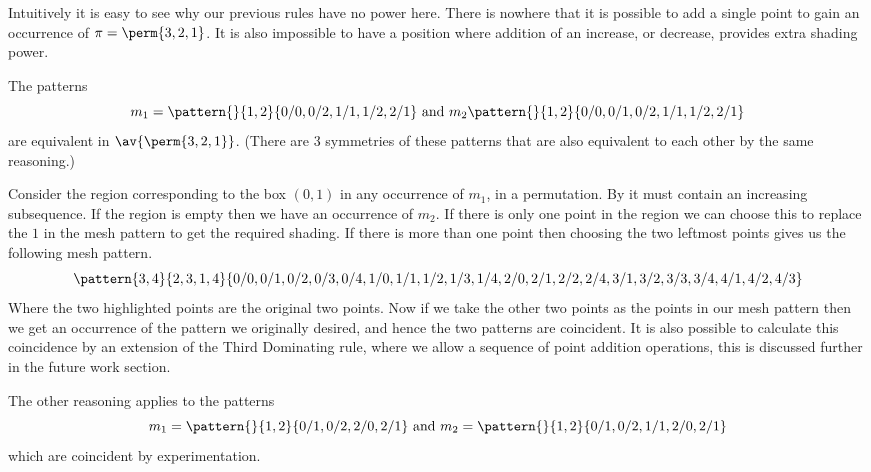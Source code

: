 Intuitively it is easy to see why our previous rules have no
power here. There is nowhere that it is possible to add a single point to
gain an occurrence of \(\pi = \perm{3,2,1}\). It is also impossible to have
a position where addition of an increase, or decrease, provides extra
shading power.

The patterns
\begin{equation*}
    m_1 = \pattern{}{1,2}{0/0, 0/2, 1/1, 1/2, 2/1} \text { and } m_2 \pattern{}{1,2}{0/0, 0/1, 0/2, 1/1, 1/2, 2/1}
\end{equation*}
are equivalent in \(\av{\perm{3,2,1}}\). (There are 3 symmetries of these
patterns that are also equivalent to each other by the same reasoning.)

Consider the region corresponding to the box \((0,1)\) in any occurrence of \(m_1\),
in a permutation. By  it must contain an increasing subsequence.
If the region is empty then we have an occurrence of \(m_2\).
If there is only one point in the region we can choose this to replace the \(1\) in
the mesh pattern to get the required shading. If there is more than one point then
choosing the two leftmost points gives us the following mesh pattern.
\begin{equation*}
    \pattern{3,4}{2,3,1,4}{0/0, 0/1, 0/2, 0/3, 0/4,
                            1/0, 1/1, 1/2, 1/3, 1/4,
                            2/0, 2/1,2/2, 2/4,
                            3/1, 3/2, 3/3, 3/4,
                            4/1, 4/2, 4/3}
\end{equation*}
Where the two highlighted points are the original two points.
Now if we take the other two points as the points in our
mesh pattern then we get an occurrence of the pattern
we originally desired, and hence the two patterns are coincident.
It is also possible to calculate this coincidence by an extension of the Third
Dominating rule, where we allow a sequence of point addition operations, this
is discussed further in the future work section.

The other reasoning applies to the patterns
\begin{equation*}
    m_1 = \pattern{}{1,2}{0/1,0/2,2/0,2/1} \text{ and } m_2 = \pattern{}{1,2}{0/1,0/2,1/1,2/0,2/1}
\end{equation*}
which are coincident by experimentation.

